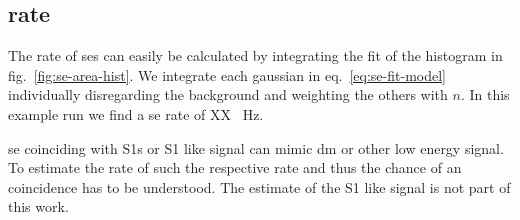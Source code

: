 
\FloatBarrier
\subsection{rate}
\label{ssec:rate}
\FloatBarrier


The rate of \gls{se}s can easily be calculated by integrating the fit of the histogram in fig.~\ref{fig:se-area-hist}.
We integrate each gaussian in eq.~\ref{eq:se-fit-model} individually disregarding the background and weighting the others with $ n $.
In this example run we find a \gls{se} rate of XX \SI{}{\hertz}.

\gls{se} coinciding with S1s or S1 like signal can mimic \gls{dm} or other low energy signal.
To estimate the rate of such the respective rate and thus the chance of an coincidence has to be understood.
The estimate of the S1 like signal is not part of this work.







